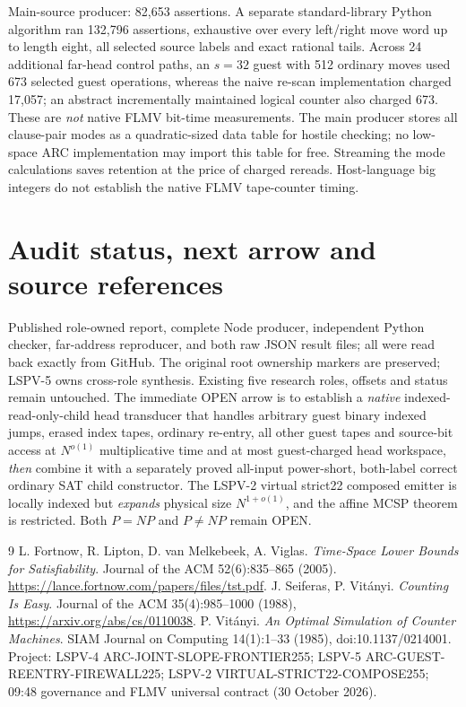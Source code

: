 \documentclass[10pt]{article}
\begin{document}
Main-source producer: 82,653 assertions. A separate standard-library Python algorithm ran 132,796 assertions, exhaustive over every left/right move word up to length eight, all selected source labels and exact rational tails. Across 24 additional far-head control paths, an $s=32$ guest with 512 ordinary moves used 673 selected guest operations, whereas the naive re-scan implementation charged 17,057; an abstract incrementally maintained logical counter also charged 673. These are \emph{not} native FLMV bit-time measurements. The main producer stores all clause-pair modes as a quadratic-sized data table for hostile checking; no low-space ARC implementation may import this table for free. Streaming the mode calculations saves retention at the price of charged rereads. Host-language big integers do not establish the native FLMV tape-counter timing.
\section{Audit status, next arrow and source references}
Published role-owned report, complete Node producer, independent Python checker, far-address reproducer, and both raw JSON result files; all were read back exactly from GitHub. The original root ownership markers are preserved; LSPV-5 owns cross-role synthesis. Existing five research roles, offsets and status remain untouched.
The immediate OPEN arrow is to establish a \emph{native} indexed-read-only-child head transducer that handles arbitrary guest binary indexed jumps, erased index tapes, ordinary re-entry, all other guest tapes and source-bit access at $N^{o(1)}$ multiplicative time and at most guest-charged head workspace, \emph{then} combine it with a separately proved all-input power-short, both-label correct ordinary SAT child constructor. The LSPV-2 virtual strict22 composed emitter is locally indexed but \emph{expands} physical size $N^{1+o(1)}$, and the affine MCSP theorem is restricted. Both $P=NP$ and $P\ne NP$ remain OPEN.
\begin{thebibliography}{9}
 L. Fortnow, R. Lipton, D. van Melkebeek, A. Viglas. \emph{Time-Space Lower Bounds for Satisfiability}. Journal of the ACM 52(6):835--865 (2005). \url{https://lance.fortnow.com/papers/files/tst.pdf}.
 J. Seiferas, P. Vit\'anyi. \emph{Counting Is Easy}. Journal of the ACM 35(4):985--1000 (1988), \url{https://arxiv.org/abs/cs/0110038}.
 P. Vit\'anyi. \emph{An Optimal Simulation of Counter Machines}. SIAM Journal on Computing 14(1):1--33 (1985), doi:10.1137/0214001.
 Project: LSPV-4 ARC-JOINT-SLOPE-FRONTIER255; LSPV-5 ARC-GUEST-REENTRY-FIREWALL225; LSPV-2 VIRTUAL-STRICT22-COMPOSE255; 09:48 governance and FLMV universal contract (30 October 2026).
\end{thebibliography}
\end{document}

